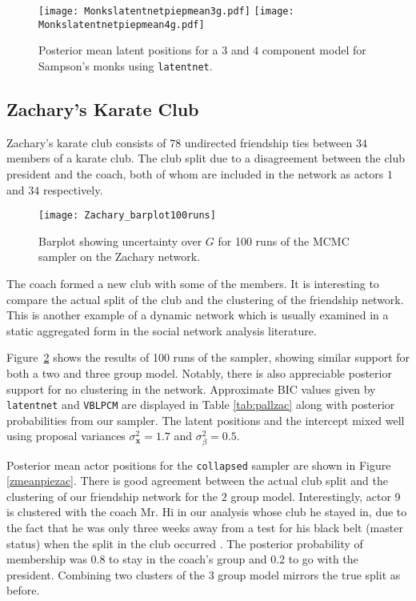 \documentclass[12pt]{article}
\newcommand{\x}{{\mathbf{x}}}
\begin{document}
\begin{figure}
 \centering
\texttt{[image: Monkslatentnetpiepmean3g.pdf]}
\texttt{[image: Monkslatentnetpiepmean4g.pdf]}
\caption{Posterior mean latent positions for a $3$ and $4$ component model for Sampson's monks using \texttt{latentnet}.}
\label{lnetmonks}
\end{figure}




\pagebreak

\subsection{Zachary's Karate Club}\label{sec:zachary}

Zachary's karate club  \cite{zachary77} consists of $78$ undirected friendship ties between $34$ members of  a karate club. 
The club split due to a disagreement between the club president and the coach, both of whom are included in the network as actors $1$ and $34$ respectively. 

\begin{figure}
\begin{center}
\texttt{[image: Zachary\_barplot100runs]}
\end{center}
\caption{Barplot showing uncertainty over $G$ for 100 runs of the MCMC sampler on the Zachary network.} \label{fig:zacbarplot}
\end{figure}

The coach formed a new club with some of the members.
It is interesting to compare the actual split of the club and the clustering of the friendship network.
This is another example of a dynamic network which is usually examined in a static aggregated form in the social network analysis literature. 

Figure~\ref{fig:zacbarplot} shows the results of 100 runs of the sampler, showing similar support for both a two and three group model. Notably, there is also appreciable posterior support for no clustering in the network. 
Approximate BIC values given by \texttt{latentnet} and \texttt{VBLPCM} are displayed in Table \ref{tab:pallzac} along with posterior probabilities from our sampler.  
The latent positions and the intercept mixed well
using proposal variances $\sigma^2_{\x}=1.7$ and $\sigma^2_\beta=0.5$. 

Posterior mean actor positions for the \texttt{collapsed} sampler are shown in Figure \ref{zmeanpiezac}. 
There is good agreement between the actual club split and the clustering of our friendship network  for the $2$ group model.  
Interestingly, actor 9 is clustered with the coach Mr. Hi in our analysis
whose club he stayed in, due to the fact that he was only three weeks away from a test for his black belt (master status) when the split in the club
 occurred \cite{zachary77}. The posterior probability of membership was 0.8 to stay in the coach's group and 0.2 to go with the president.
Combining two clusters of the $3$ group model mirrors the true split as before. 
\end{document}
